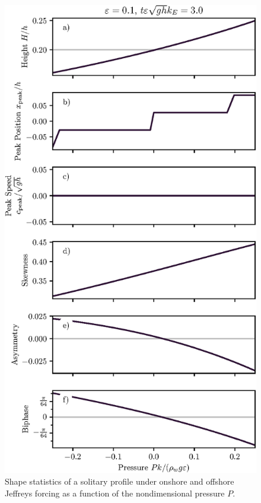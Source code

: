 \documentclass{jfm}
\begin{document}
\begin{figure}
  \centering
  \includegraphics{Skew-Asymm-Cnoidal-P.eps}
  \caption{
    Shape statistics of a solitary profile under onshore and offshore
    Jeffreys forcing as a function of the nondimensional pressure $P$.
  }
\end{figure}
\end{document}
